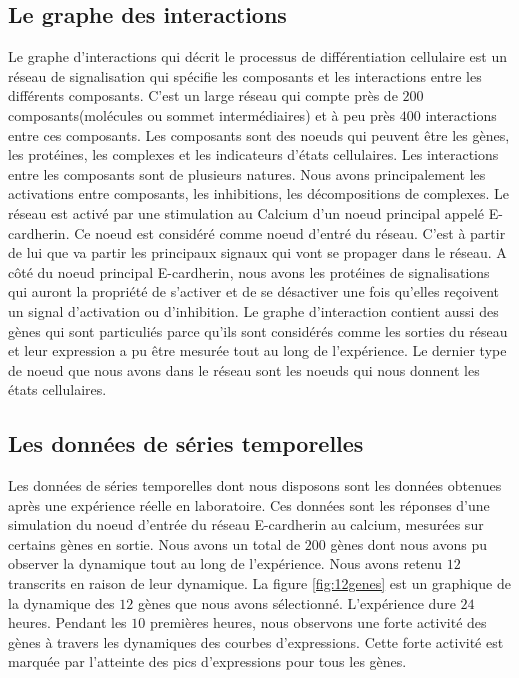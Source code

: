\subsection{Le graphe des interactions}
Le graphe d'interactions qui décrit le processus de différentiation cellulaire est un réseau de signalisation qui spécifie 
les composants et les interactions entre les différents composants. C'est un large réseau qui compte près de $200$ composants(molécules ou sommet intermédiaires) 
et à peu près $400$ interactions entre ces composants. 
Les composants sont des noeuds qui peuvent être les gènes, les protéines, les complexes et les indicateurs d'états cellulaires.
Les interactions entre les composants sont de plusieurs natures. Nous avons principalement les activations entre composants, les inhibitions,
les décompositions de complexes. Le réseau est activé par une stimulation au Calcium d'un noeud principal appelé E-cardherin. Ce noeud est considéré 
comme noeud d'entré du réseau. C'est à partir de lui que va partir les principaux signaux qui vont se propager dans le réseau. A côté du noeud 
principal E-cardherin, nous avons les protéines de signalisations qui auront la propriété de s'activer et de se désactiver une fois qu'elles reçoivent un  
signal d'activation ou d'inhibition. Le graphe d'interaction contient aussi des gènes qui sont particuliés parce qu'ils sont considérés comme 
les sorties du réseau et leur expression a pu être mesurée tout au long de l'expérience. Le dernier type de noeud que nous avons dans le réseau sont 
les noeuds qui nous donnent les états cellulaires. 



\subsection{Les données de séries temporelles}

Les données de séries temporelles dont nous disposons  sont les données obtenues après une expérience réelle en laboratoire. Ces données sont les réponses d'une simulation 
du noeud d'entrée du réseau E-cardherin au calcium, mesurées sur certains gènes en sortie. Nous avons un total de $200$ gènes dont nous avons pu observer la dynamique tout au long 
de l'expérience. Nous avons retenu $12$ transcrits en raison de leur dynamique. La figure \ref{fig:12genes} est un graphique de la dynamique des
$12$ gènes que nous avons sélectionné. L'expérience dure $24$ heures. Pendant les $10$ premières heures, nous observons une forte activité des gènes à travers 
les dynamiques des courbes d'expressions. Cette forte activité est marquée par l'atteinte des pics d'expressions pour tous les gènes.  

